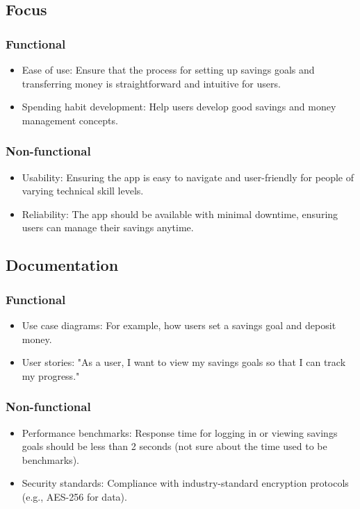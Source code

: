 \documentclass{article}
\begin{document}
\subsection{Focus}
\subsubsection{Functional}
\begin{itemize}
    \item Ease of use: Ensure that the process for setting up savings goals and transferring money is straightforward and intuitive for users.
    \item Spending habit development: Help users develop good savings and money management concepts.
\end{itemize}
\subsubsection{Non-functional}
\begin{itemize}
    \item Usability: Ensuring the app is easy to navigate and user-friendly for people of varying technical skill levels.
    \item Reliability: The app should be available with minimal downtime, ensuring users can manage their savings anytime.
\end{itemize}

\subsection{Documentation}
\subsubsection{Functional}
\begin{itemize}
    \item Use case diagrams: For example, how users set a savings goal and deposit money.
    \item User stories: "As a user, I want to view my savings goals so that I can track my progress."
\end{itemize}
\subsubsection{Non-functional}
\begin{itemize}
    \item Performance benchmarks: Response time for logging in or viewing savings goals should be less than 2 seconds (not sure about the time used to be benchmarks).
    \item Security standards: Compliance with industry-standard encryption protocols (e.g., AES-256 for data).
\end{itemize}
\end{document}
